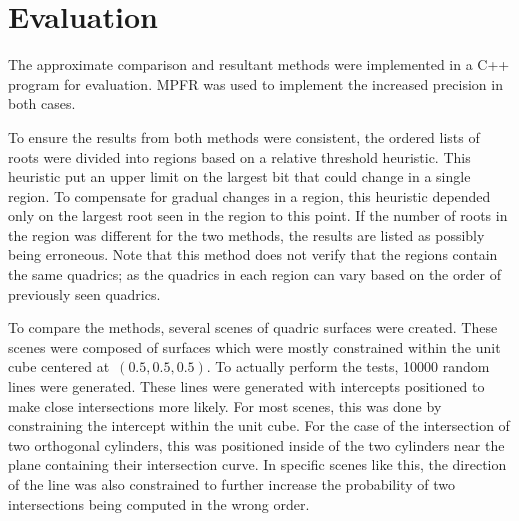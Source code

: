 \documentclass{cccg16}
\begin{document}
\section{Evaluation}
The approximate comparison and resultant methods were implemented in a
C++ program for evaluation.  MPFR was used to implement the increased
precision in both cases.

To ensure the results from both methods were consistent, the ordered
lists of roots were divided into regions based on a relative threshold
heuristic.  This heuristic put an upper limit on the largest bit that
could change in a single region.  To compensate for gradual changes in
a region, this heuristic depended only on the largest root seen in the
region to this point.  If the number of roots in the region was
different for the two methods, the results are listed as possibly
being erroneous.  Note that this method does not verify that the
regions contain the same quadrics; as the quadrics in each region can
vary based on the order of previously seen quadrics.

To compare the methods, several scenes of quadric surfaces were
created.  These scenes were composed of surfaces which were mostly
constrained within the unit cube centered at~$(0.5, 0.5, 0.5)$.  To
actually perform the tests, 10000 random lines were generated.  These
lines were generated with intercepts positioned to make close
intersections more likely.  For most scenes, this was done by
constraining the intercept within the unit cube.  For the case of the
intersection of two orthogonal cylinders, this was positioned inside
of the two cylinders near the plane containing their intersection
curve.  In specific scenes like this, the direction of the line was
also constrained to further increase the probability of two
intersections being computed in the wrong order.
\end{document}
